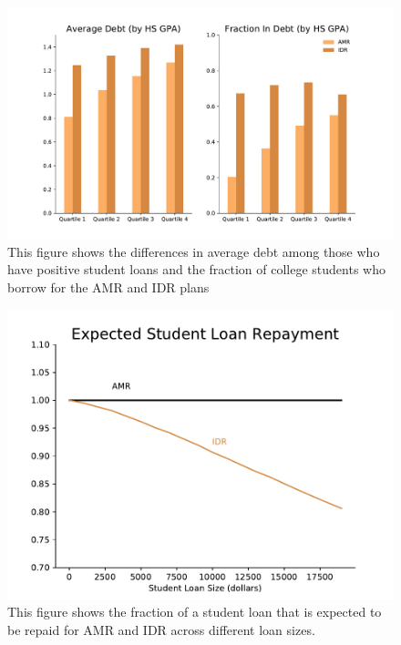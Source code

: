   \begin{center}
    \begin{figure}[H]
      \includegraphics[width=\textwidth]{images/StudentLoans/DebtByGPA.pdf}
      \caption{
        {\small This figure shows the differences in average debt among those who have positive
        student loans and the fraction of college students who borrow for the AMR and IDR plans}
      }
      \label{fig:debt_by_gpa}
    \end{figure}
  \end{center}

  \begin{center}
    \begin{figure}[H]
      \includegraphics[width=\textwidth]{images/StudentLoans/expected_repayment.pdf}
      \caption{
        {\small This figure shows the fraction of a student loan that is expected to be repaid for
        AMR and IDR across different loan sizes.}
      }
      \label{fig:expected_repayment}
    \end{figure}
  \end{center}
